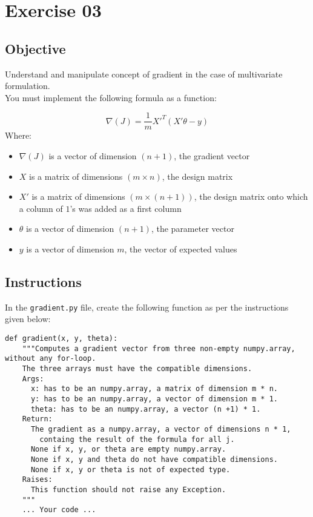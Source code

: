 \chapter{Exercise 03}

\newpage
{}
\makeheaderfilesforbidden

\section*{Objective}
Understand and manipulate concept of gradient in the case of multivariate formulation.\\
\newline
You must implement the following formula as a function:    

$$
\nabla(J) = \frac{1}{m} {X'}^T(X'\theta - y)
$$  
Where:  
\begin{itemize}
  \item $\nabla(J)$ is a vector of dimension $(n + 1)$, the gradient vector
  \item $X$ is a matrix of dimensions $(m \times n)$, the design matrix
  \item $X'$ is a matrix of dimensions $(m \times (n + 1))$, the design matrix onto which a column of $1$'s was added as a first column
  \item $\theta$ is a vector of dimension $(n + 1)$, the parameter vector
  \item $y$ is a vector of dimension $m$, the vector of expected values
\end{itemize}

\section*{Instructions}
In the \texttt{gradient.py} file, create the following function as per the instructions given below:\\
\newline
\par
\begin{verbatim}
def gradient(x, y, theta):
    """Computes a gradient vector from three non-empty numpy.array, without any for-loop.
    The three arrays must have the compatible dimensions.
    Args:
      x: has to be an numpy.array, a matrix of dimension m * n.
      y: has to be an numpy.array, a vector of dimension m * 1.
      theta: has to be an numpy.array, a vector (n +1) * 1.
    Return:
      The gradient as a numpy.array, a vector of dimensions n * 1,
        containg the result of the formula for all j.
      None if x, y, or theta are empty numpy.array.
      None if x, y and theta do not have compatible dimensions.
      None if x, y or theta is not of expected type.
    Raises:
      This function should not raise any Exception.
    """
    ... Your code ...
\end{verbatim}

